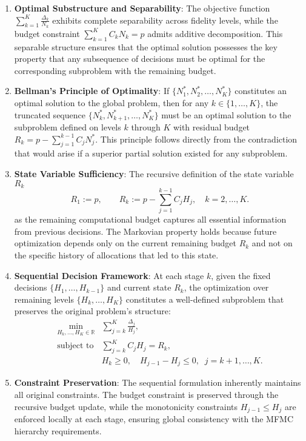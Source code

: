 \begin{enumerate}

    \item \textbf{Optimal Substructure and Separability}: The objective function $\sum_{k=1}^K \frac{\Delta_k}{N_k}$ exhibits complete separability across fidelity levels, while the budget constraint $\sum_{k=1}^K C_kN_k = p$ admits additive decomposition. This separable structure ensures that the optimal solution possesses the key property that any subsequence of decisions must be optimal for the corresponding subproblem with the remaining budget.

    \item \textbf{Bellman's Principle of Optimality}: If $\{N_1^*, N_2^*, \ldots, N_K^*\}$ constitutes an optimal solution to the global problem, then for any $k \in \{1,\ldots,K\}$, the truncated sequence $\{N_k^*, N_{k+1}^*, \ldots, N_K^*\}$ must be an optimal solution to the subproblem defined on levels $k$ through $K$ with residual budget $R_k = p - \sum_{j=1}^{k-1} C_j N_j^*$. This principle follows directly from the contradiction that would arise if a superior partial solution existed for any subproblem.

    \item \textbf{State Variable Sufficiency}: The recursive definition of the state variable $R_k$ 
    \[
    R_1 := p, \qquad R_k := p - \sum_{j=1}^{k-1} C_j H_j, \quad k=2,\ldots,K.
    \]
    as the remaining computational budget captures all essential information from previous decisions. The Markovian property holds because future optimization depends only on the current remaining budget $R_k$ and not on the specific history of allocations that led to this state.


    \item \textbf{Sequential Decision Framework}: At each stage $k$, given the fixed decisions $\{H_1, \ldots, H_{k-1}\}$ and current state $R_k$, the optimization over remaining levels $\{H_k, \ldots, H_K\}$ constitutes a well-defined subproblem that preserves the original problem's structure:
    \begin{equation}\label{eq:Sequential_Optimization}
        \begin{array}{ll}
        \displaystyle 
        \min_{H_k,\ldots,H_K\in \mathbb{R}} & 
            \displaystyle 
            \sum_{j=k}^K \frac{\Delta_j}{H_{j}}, \\
        \text{subject to} &
            \displaystyle \sum_{j=k}^K C_j H_j = R_k,\\
            &H_k\ge 0,\quad H_{j-1}-H_j\le 0,\;\; j=k+1,\ldots,K.
        \end{array}
    \end{equation}

    \item \textbf{Constraint Preservation}: The sequential formulation inherently maintains all original constraints. The budget constraint is preserved through the recursive budget update, while the monotonicity constraints $H_{j-1} \leq H_j$ are enforced locally at each stage, ensuring global consistency with the MFMC hierarchy requirements.
\end{enumerate}

